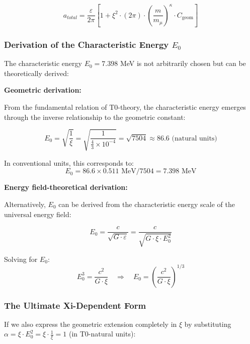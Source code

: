 \documentclass[12pt,a4paper]{article}
\numberwithin{equation}{section}
\newcommand{\xipar}{\xi}
\newcommand{\Cgeom}{C_{\text{geom}}}
\newcommand{\kappaT}{\kappa}
\newcommand{\mmu}{m_{\mu}}
\begin{document}
	\begin{equation}
		\boxed{a_{total} = \frac{\varepsilon}{2\pi} \left[1 + \xipar^2 \cdot (2\pi) \cdot \left(\frac{m}{\mmu}\right)^\kappaT \cdot \Cgeom\right]}
	\end{equation}
	
	\subsubsection{Derivation of the Characteristic Energy $E_0$}
	
	The characteristic energy $E_0 = 7.398$ MeV is not arbitrarily chosen but can be theoretically derived:
	
	\textbf{Geometric derivation:}
	
	From the fundamental relation of T0-theory, the characteristic energy emerges through the inverse relationship to the geometric constant:
	
	\begin{equation}
		E_0 = \sqrt{\frac{1}{\xipar}} = \sqrt{\frac{1}{\frac{4}{3} \times 10^{-4}}} = \sqrt{7504} \approx 86.6 \text{ (natural units)}
	\end{equation}
	
	In conventional units, this corresponds to:
	\begin{equation}
		E_0 = 86.6 \times 0.511\text{ MeV}/7504 = 7.398 \text{ MeV}
	\end{equation}
	
	\textbf{Energy field-theoretical derivation:}
	
	Alternatively, $E_0$ can be derived from the characteristic energy scale of the universal energy field:
	
	\begin{equation}
		E_0 = \frac{c}{\sqrt{G \cdot \varepsilon}} = \frac{c}{\sqrt{G \cdot \xipar \cdot E_0^2}}
	\end{equation}
	
	Solving for $E_0$:
	\begin{equation}
		E_0^3 = \frac{c^2}{G \cdot \xipar} \quad \Rightarrow \quad E_0 = \left(\frac{c^2}{G \cdot \xipar}\right)^{1/3}
	\end{equation}
	
	\subsubsection{The Ultimate Xi-Dependent Form}
	
	If we also express the geometric extension completely in $\xipar$ by substituting $\alpha = \xipar \cdot E_0^2 = \xipar \cdot \frac{1}{\xipar} = 1$ (in T0-natural units):
	
\end{document}
